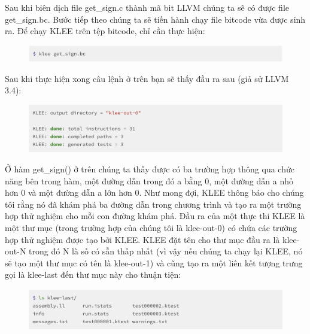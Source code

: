 \documentclass[12pt,a4paper]{article}
\begin{document}
Sau khi biên dịch file get\_sign.c thành mã bit LLVM chúng ta sẽ có được file get\_sign.bc. Bước tiếp theo chúng ta sẽ tiến hành chạy file bitcode vừa được sinh ra. Để chạy KLEE trên tệp bitcode, chỉ cần thực hiện:

\begin{figure}[ht]
\begin{center}
\includegraphics[scale=.3]{hinhanh/runningklee.png}
\end{center}
\end{figure}

Sau khi thực hiện xong câu lệnh ở trên bạn sẽ thấy đầu ra sau (giả sử LLVM 3.4):

\begin{figure}[ht]
\begin{center}
\includegraphics[scale=.3]{hinhanh/outputklee.png}
\end{center}
\end{figure}

Ở hàm get\_sign() ở trên chúng ta thấy được có  ba trường hợp thông qua chức năng bên trong hàm, một đường dẫn trong đó a bằng 0, một đường dẫn a nhỏ hơn 0 và một đường dẫn a lớn hơn 0. Như mong đợi, KLEE thông báo cho chúng tôi rằng nó đã khám phá ba đường dẫn trong chương trình và tạo ra một trường hợp thử nghiệm cho mỗi con đường khám phá. Đầu ra của một thực thi KLEE là một thư mục (trong trường hợp của chúng tôi là klee-out-0) có chứa các trường hợp thử nghiệm được tạo bởi KLEE. KLEE đặt tên cho thư mục đầu ra là klee-out-N trong đó N là số có sẵn thấp nhất (vì vậy nếu chúng ta chạy lại KLEE, nó sẽ tạo một thư mục có tên là klee-out-1) và cũng tạo ra một liên kết tượng trưng gọi là klee-last đến thư mục này cho thuận tiện:

\begin{figure}[ht]
\begin{center}
\includegraphics[scale=.3]{hinhanh/outputfolder.png}
\end{center}
\end{figure}
\end{document}
